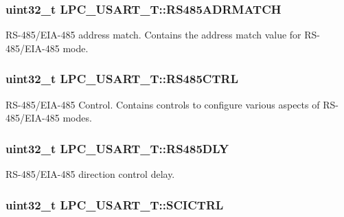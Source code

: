 \hypertarget{structLPC__USART__T_adfc2810503e8eb5f4d9bc4622500295e}{
\subsubsection[{R\-S485\-A\-D\-R\-M\-A\-T\-C\-H}]{ uint32\-\_\-t L\-P\-C\-\_\-\-U\-S\-A\-R\-T\-\_\-\-T\-::\-R\-S485\-A\-D\-R\-M\-A\-T\-C\-H}}\label{structLPC__USART__T_adfc2810503e8eb5f4d9bc4622500295e}
R\-S-\/485/\-E\-I\-A-\/485 address match. Contains the address match value for R\-S-\/485/\-E\-I\-A-\/485 mode. \hypertarget{structLPC__USART__T_a6a7e49f50f49efbe8e11befcf6e7d6b4}{
\subsubsection[{R\-S485\-C\-T\-R\-L}]{ uint32\-\_\-t L\-P\-C\-\_\-\-U\-S\-A\-R\-T\-\_\-\-T\-::\-R\-S485\-C\-T\-R\-L}}\label{structLPC__USART__T_a6a7e49f50f49efbe8e11befcf6e7d6b4}
R\-S-\/485/\-E\-I\-A-\/485 Control. Contains controls to configure various aspects of R\-S-\/485/\-E\-I\-A-\/485 modes. \hypertarget{structLPC__USART__T_a6e9fc8109a269820386a36c81dc943ab}{
\subsubsection[{R\-S485\-D\-L\-Y}]{ uint32\-\_\-t L\-P\-C\-\_\-\-U\-S\-A\-R\-T\-\_\-\-T\-::\-R\-S485\-D\-L\-Y}}\label{structLPC__USART__T_a6e9fc8109a269820386a36c81dc943ab}
R\-S-\/485/\-E\-I\-A-\/485 direction control delay. \hypertarget{structLPC__USART__T_aa8ad1461441995d0b618ff7f5b0e42be}{
\subsubsection[{S\-C\-I\-C\-T\-R\-L}]{ uint32\-\_\-t L\-P\-C\-\_\-\-U\-S\-A\-R\-T\-\_\-\-T\-::\-S\-C\-I\-C\-T\-R\-L}}\label{structLPC__USART__T_aa8ad1461441995d0b618ff7f5b0e42be}
